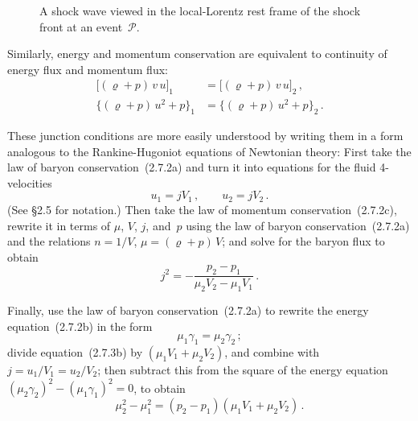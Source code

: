 \begin{figure}[htbp]
\centering
{}
\caption{A shock wave viewed in the local-Lorentz rest frame of the shock
  front at an event~$\mathscr{P}$.}
\label{fig:2.7.1}
\end{figure}

\noindent
Similarly, energy and momentum conservation are equivalent to continuity of
energy flux and momentum flux:
%
\begin{align}
  \bigl[(\varrho + p)\,v\,u\bigr]_1
    &= \bigl[(\varrho + p)\,v\,u\bigr]_2\,,
  \tag{2.7.2b} \\
  \bigl\{(\varrho + p)\,u^2 + p\bigr\}_1
    &= \bigl\{(\varrho + p)\,u^2 + p\bigr\}_2\,.
  \tag{2.7.2c}
\end{align}

These junction conditions are more easily understood by writing them in a
form analogous to the Rankine-Hugoniot equations of Newtonian theory: First
take the law of baryon conservation~(2.7.2a) and turn it into equations for
the fluid 4-velocities
%
\begin{equation}
  u_1 = jV_1\,, \qquad u_2 = jV_2\,.
  \tag{2.7.3a}
\end{equation}
%
(See \S2.5 for notation.) Then take the law of momentum conservation~(2.7.2c),
rewrite it in terms of $\mu$, $V$, $j$, and~$p$ using the law of baryon
conservation~(2.7.2a) and the relations $n = 1/V$,
$\mu = (\varrho + p)\,V$; and solve for the baryon flux to obtain
%
\begin{equation}
  j^2 = -\frac{p_2 - p_1}{\mu_2 V_2 - \mu_1 V_1}\,.
  \tag{2.7.3b}
\end{equation}

Finally, use the law of baryon conservation~(2.7.2a) to rewrite the energy
equation~(2.7.2b) in the form
%
\begin{equation}
  \mu_1\gamma_1 = \mu_2\gamma_2\,;
\end{equation}
%
divide equation~(2.7.3b) by $(\mu_1 V_1 + \mu_2 V_2)$, and combine with
$j = u_1/V_1 = u_2/V_2$; then subtract this from the square of the energy
equation $(\mu_2\gamma_2)^2 - (\mu_1\gamma_1)^2 = 0$, to obtain
%
\begin{equation}
  \mu_2^2 - \mu_1^2 = (p_2 - p_1)(\mu_1 V_1 + \mu_2 V_2)\,.
  \tag{2.7.3c}
\end{equation}

